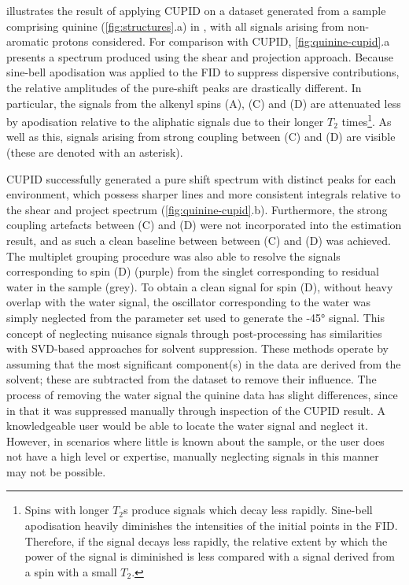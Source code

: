  illustrates the result of applying \ac{CUPID} on
a dataset generated from a sample comprising quinine (\cref{fig:structures}.a)
in ,
with all signals arising from non-aromatic protons considered.
For comparison with \ac{CUPID}, \cref{fig:quinine-cupid}.a presents a
spectrum produced using the shear and projection approach. Because
sine-bell apodisation was applied to the \ac{FID} to suppress dispersive
contributions, the relative amplitudes of the pure-shift
peaks are drastically different.  In particular, the signals from the alkenyl
spins (A), (C) and (D) are attenuated less by apodisation relative to the
aliphatic signals due to their longer $T_2$ times\footnote{
    Spins with longer $T_2$s produce signals which decay less rapidly.
    Sine-bell apodisation heavily diminishes the intensities of the initial
    points in the \ac{FID}. Therefore, if the signal decays less rapidly, the
    relative extent by which the power of the signal is diminished is less
    compared with a signal derived from a spin with a small $T_2$.
}. As well as this, signals arising from strong coupling between (C) and
(D) are visible (these are denoted with an asterisk).

\ac{CUPID} successfully generated a pure shift spectrum with distinct peaks for
each  environment, which possess sharper lines and more consistent
integrals relative to the shear and project spectrum (\cref{fig:quinine-cupid}.b).
Furthermore, the strong coupling artefacts between (C) and (D) were not
incorporated into the estimation result, and as such a clean baseline between
between (C) and (D) was achieved.
The multiplet grouping procedure was also able to resolve
the signals corresponding to spin (D) (purple) from the singlet corresponding
to residual water in the sample (grey).
To obtain a clean signal for spin (D), without heavy overlap with the water
signal, the oscillator corresponding to the water was simply neglected from
the parameter set used to generate the \ang{-45} signal. This concept of
neglecting nuisance signals through post-processing has similarities with
\ac{SVD}-based approaches for solvent suppression\cite{Zhu1997}.
These methods operate by assuming that the most significant component(s) in the
data are derived from the solvent; these are subtracted from the dataset to
remove their influence. The process of removing the water signal the quinine
data has slight differences, since in that it was suppressed manually through
inspection of the \ac{CUPID} result. A knowledgeable user would be able to
locate the water signal and neglect it. However, in scenarios where little is
known about the sample, or the user does not have a high level or expertise,
manually neglecting signals in this manner may not be possible.

